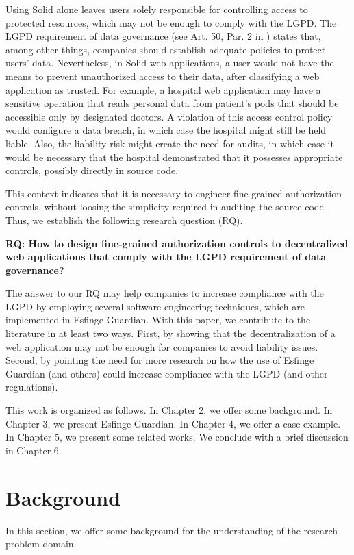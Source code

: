 \documentclass[sigconf]{acmart}
\begin{document}
Using Solid alone leaves users solely responsible for controlling access to protected resources, which may not be enough to comply with the LGPD. The LGPD requirement of data governance (see Art. 50, Par. 2 in \cite{LGPD18}) states that, among other things, companies should establish adequate policies to protect users' data. Nevertheless, in Solid web applications, a user would not have the means to prevent unauthorized access to their data, after classifying a web application as trusted. For example, a hospital web application may have a sensitive operation that reads personal data from patient's pods that should be accessible only by designated doctors. A violation of this access control policy would configure a data breach, in which case the hospital might still be held liable. Also, the liability risk might create the need for audits, in which case it would be necessary that the hospital demonstrated that it possesses appropriate controls, possibly directly in source code.

This context indicates that it is necessary to engineer fine-grained authorization controls, without loosing the simplicity required in auditing the source code. Thus, we establish the following research question (RQ).

\vspace{0.15cm}
\noindent \textbf{RQ: How to design fine-grained authorization controls to decentralized web applications that comply with the LGPD requirement of data governance?}
\vspace{0.15cm}

The answer to our RQ may help companies to increase compliance with the LGPD by employing several software engineering techniques, which are implemented in Esfinge Guardian. With this paper, we contribute to the literature in at least two ways. First, by showing that the decentralization of a web application may not be enough for companies to avoid liability issues. Second, by pointing the need for more research on how the use of Esfinge Guardian (and others) could increase compliance with the LGPD (and other regulations).

This work is organized as follows. In Chapter 2, we offer some background. In Chapter 3, we present Esfinge Guardian. In Chapter 4, we offer a case example. In Chapter 5, we present some related works. We conclude with a brief discussion in Chapter 6.


\section{Background}
In this section, we offer some background for the understanding of the research problem domain.
\end{document}
